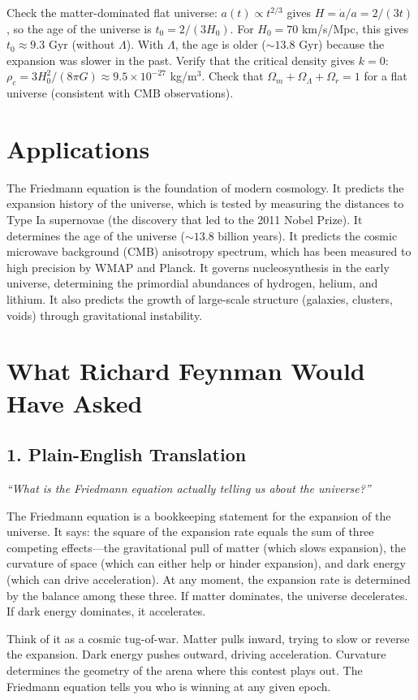 \documentclass[11pt,openright]{book}
\begin{document}
Check the matter-dominated flat universe: $a(t) \propto t^{2/3}$ gives $H = \dot{a}/a = 2/(3t)$, so the age of the universe is $t_0 = 2/(3H_0)$. For $H_0 = 70$ km/s/Mpc, this gives $t_0 \approx 9.3$ Gyr (without $\Lambda$). With $\Lambda$, the age is older ($\sim 13.8$ Gyr) because the expansion was slower in the past. Verify that the critical density gives $k = 0$: $\rho_c = 3H_0^2/(8\pi G) \approx 9.5 \times 10^{-27}$ kg/m$^3$. Check that $\Omega_m + \Omega_\Lambda + \Omega_r = 1$ for a flat universe (consistent with CMB observations).
\section*{Applications}

The Friedmann equation is the foundation of modern cosmology. It predicts the expansion history of the universe, which is tested by measuring the distances to Type Ia supernovae (the discovery that led to the 2011 Nobel Prize). It determines the age of the universe ($\sim 13.8$ billion years). It predicts the cosmic microwave background (CMB) anisotropy spectrum, which has been measured to high precision by WMAP and Planck. It governs nucleosynthesis in the early universe, determining the primordial abundances of hydrogen, helium, and lithium. It also predicts the growth of large-scale structure (galaxies, clusters, voids) through gravitational instability.
\section*{What Richard Feynman Would Have Asked}

\subsection*{1. Plain-English Translation}
\textit{``What is the Friedmann equation actually telling us about the universe?''}

The Friedmann equation is a bookkeeping statement for the expansion of the universe. It says: the square of the expansion rate equals the sum of three competing effects---the gravitational pull of matter (which slows expansion), the curvature of space (which can either help or hinder expansion), and dark energy (which can drive acceleration). At any moment, the expansion rate is determined by the balance among these three. If matter dominates, the universe decelerates. If dark energy dominates, it accelerates.

Think of it as a cosmic tug-of-war. Matter pulls inward, trying to slow or reverse the expansion. Dark energy pushes outward, driving acceleration. Curvature determines the geometry of the arena where this contest plays out. The Friedmann equation tells you who is winning at any given epoch.
\end{document}
